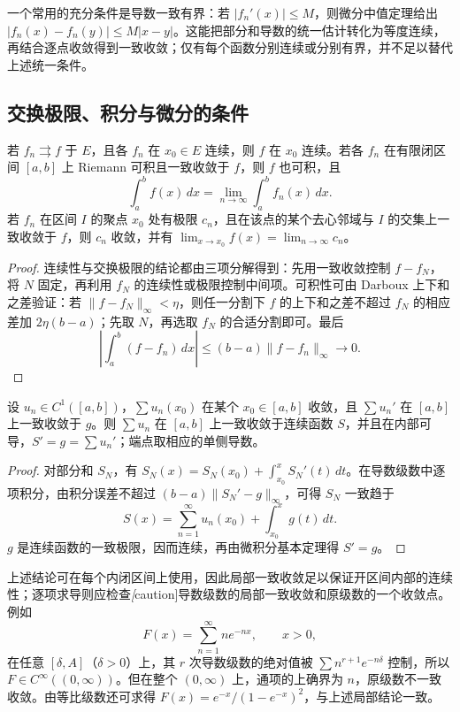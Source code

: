 一个常用的充分条件是导数一致有界：若 $|f_n'(x)|\leq M$，则微分中值定理给出 $|f_n(x)-f_n(y)|\leq M|x-y|$。这能把部分和导数的统一估计转化为等度连续，再结合逐点收敛得到一致收敛；仅有每个函数分别连续或分别有界，并不足以替代上述统一条件。

\subsection{交换极限、积分与微分的条件}

\begin{theorem}[一致收敛的基本运算性质]
\label{thm:pei-uniform-operations}
若 $f_n\rightrightarrows f$ 于 $E$，且各 $f_n$ 在 $x_0\in E$ 连续，则 $f$ 在 $x_0$ 连续。若各 $f_n$ 在有限闭区间 $[a,b]$ 上 Riemann 可积且一致收敛于 $f$，则 $f$ 也可积，且
\[
 \int_a^bf(x)\,dx=\lim_{n\to\infty}\int_a^bf_n(x)\,dx.
\]
若 $f_n$ 在区间 $I$ 的聚点 $x_0$ 处有极限 $c_n$，且在该点的某个去心邻域与 $I$ 的交集上一致收敛于 $f$，则 $c_n$ 收敛，并有 $\lim_{x\to x_0}f(x)=\lim_{n\to\infty}c_n$。
\end{theorem}
\begin{proof}
连续性与交换极限的结论都由三项分解得到：先用一致收敛控制 $f-f_N$，将 $N$ 固定，再利用 $f_N$ 的连续性或极限控制中间项。可积性可由 Darboux 上下和之差验证：若 $\|f-f_N\|_\infty<\eta$，则任一分割下 $f$ 的上下和之差不超过 $f_N$ 的相应差加 $2\eta(b-a)$；先取 $N$，再选取 $f_N$ 的合适分割即可。最后
\[
 \left|\int_a^b(f-f_n)\,dx\right|\leq(b-a)\|f-f_n\|_\infty\longrightarrow0.
\]
\end{proof}

\begin{theorem}[逐项求导]
\label{thm:pei-termwise-derivative}
设 $u_n\in C^1([a,b])$，$\sum u_n(x_0)$ 在某个 $x_0\in[a,b]$ 收敛，且 $\sum u_n'$ 在 $[a,b]$ 上一致收敛于 $g$。则 $\sum u_n$ 在 $[a,b]$ 上一致收敛于连续函数 $S$，并且在内部可导，$S'=g=\sum u_n'$；端点取相应的单侧导数。
\end{theorem}
\begin{proof}
对部分和 $S_N$，有 $S_N(x)=S_N(x_0)+\int_{x_0}^{x}S_N'(t)\,dt$。在导数级数中逐项积分，由积分误差不超过 $(b-a)\|S_N'-g\|_\infty$，可得 $S_N$ 一致趋于
\[
 S(x)=\sum_{n=1}^{\infty}u_n(x_0)+\int_{x_0}^{x}g(t)\,dt.
\]
$g$ 是连续函数的一致极限，因而连续，再由微积分基本定理得 $S'=g$。
\end{proof}

上述结论可在每个内闭区间上使用，因此局部一致收敛足以保证开区间内部的连续性；逐项求导则应检查\emph[caution]{导数级数}的局部一致收敛和原级数的一个收敛点。例如
\[
 F(x)=\sum_{n=1}^{\infty}ne^{-nx},\qquad x>0,
\]
在任意 $[\delta,A]$（$\delta>0$）上，其 $r$ 次导数级数的绝对值被 $\sum n^{r+1}e^{-n\delta}$ 控制，所以 $F\in C^\infty((0,\infty))$。但在整个 $(0,\infty)$ 上，通项的上确界为 $n$，原级数不一致收敛。由等比级数还可求得 $F(x)=e^{-x}/(1-e^{-x})^2$，与上述局部结论一致。

